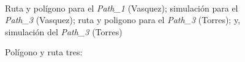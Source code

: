 \documentclass[]{report}
\begin{document}
\begin{figure}%
	\centering
	\hspace{8pt}%
	 \\
	\hspace{8pt}%
	
	\caption[A set of four subfigures.]{Polígono y ruta tres:}
	 Ruta y polígono para el \textit{Path\_1} (Vasquez);
	 simulación para el \textit{Path\_3} (Vasquez);
	 ruta y poligono para el \textit{Path\_3} (Torres); y,
	 simulación del \textit{Path\_3} (Torres)%
	\label{path_3}%
\end{figure}
\end{document}
